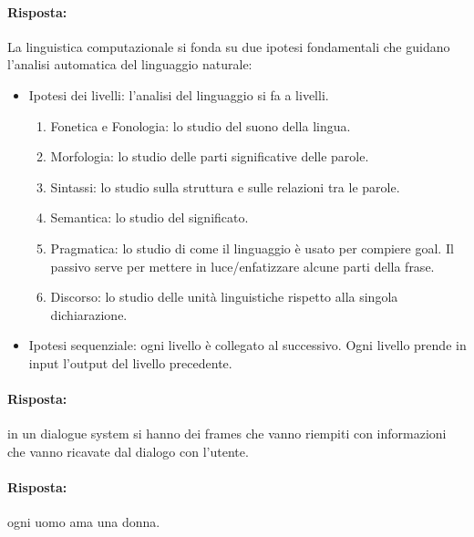 
\paragraph{Risposta:} La linguistica computazionale si fonda su due ipotesi fondamentali che guidano l'analisi automatica del linguaggio naturale:

\begin{itemize}
  \item Ipotesi dei livelli: l'analisi del linguaggio si fa a livelli. 
    
\begin{enumerate}
  \item Fonetica e Fonologia: lo studio del suono della lingua. 
  \item Morfologia: lo studio delle parti significative delle parole. 
  \item Sintassi: lo studio sulla struttura e sulle relazioni tra le parole. 
  \item Semantica: lo studio del significato. 
  \item Pragmatica: lo studio di come il linguaggio è usato per compiere goal. Il passivo serve per mettere in luce/enfatizzare alcune parti della frase. 
  \item Discorso: lo studio delle unità linguistiche rispetto alla singola dichiarazione.
    \end{enumerate}
  \item Ipotesi sequenziale: ogni livello è collegato al successivo. Ogni livello prende in input l'output del livello precedente. 

\end{itemize}

\paragraph{Risposta:} in un dialogue system si hanno dei frames che vanno riempiti con informazioni che vanno ricavate dal dialogo con l'utente. 



\paragraph{Risposta:} ogni uomo ama una donna. 

